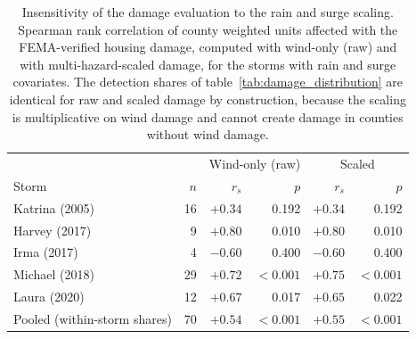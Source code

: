 \begin{table}[htb!]
\centering
\caption{Insensitivity of the damage evaluation to the rain and surge
scaling. Spearman rank correlation of county weighted units affected
with the FEMA-verified housing damage, computed with wind-only (raw)
and with multi-hazard-scaled damage, for the storms with rain and
surge covariates. The detection shares of
table~\ref{tab:damage_distribution} are identical for raw and scaled
damage by construction, because the scaling is multiplicative on wind
damage and cannot create damage in counties without wind damage.}
\label{tab:scaling_robustness}
\begin{tabular}{lrrrrr}
\hline
 & & \multicolumn{2}{c}{Wind-only (raw)} & \multicolumn{2}{c}{Scaled} \\
Storm & $n$ & $r_s$ & $p$ & $r_s$ & $p$ \\
\hline
Katrina (2005) & 16 & $+0.34$ & 0.192 & $+0.34$ & 0.192 \\
Harvey (2017) & 9 & $+0.80$ & 0.010 & $+0.80$ & 0.010 \\
Irma (2017) & 4 & $-0.60$ & 0.400 & $-0.60$ & 0.400 \\
Michael (2018) & 29 & $+0.72$ & $<0.001$ & $+0.75$ & $<0.001$ \\
Laura (2020) & 12 & $+0.67$ & 0.017 & $+0.65$ & 0.022 \\
Pooled (within-storm shares) & 70 & $+0.54$ & $<0.001$ & $+0.55$ & $<0.001$ \\
\hline
\end{tabular}
\end{table}
